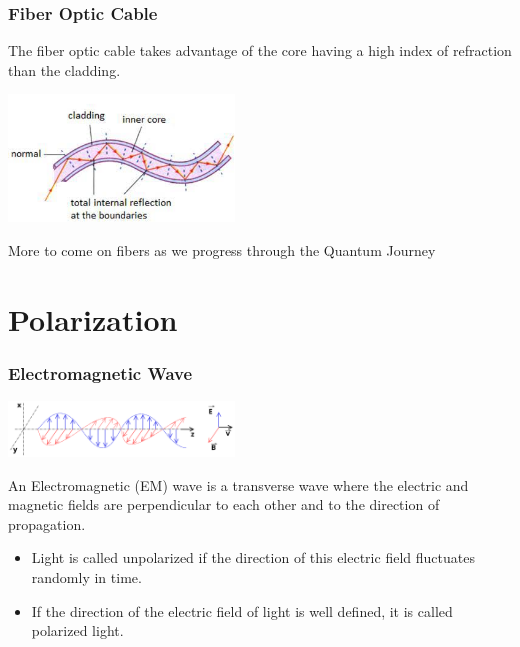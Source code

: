 \documentclass{beamer}
\begin{document}
\begin{frame}\frametitle{Fiber Optic Cable}
The fiber optic cable takes advantage of the core having a high index of refraction than the cladding.

\begin{center}
\includegraphics[width=6cm]{fig/cladding.jpg}
\end{center}

\vspace{3cm}

More to come on fibers as we progress through the Quantum Journey


\end{frame}


\section{Polarization}

\begin{frame}\frametitle{Electromagnetic Wave}

\begin{center}
\includegraphics[width=6cm]{fig/em_wave.png}
\end{center}

An Electromagnetic (EM) wave is a transverse wave where the electric and magnetic fields are perpendicular to each other and to the direction of propagation. 

\begin{itemize}
\item Light is called unpolarized if the direction of this electric field fluctuates randomly in time. 
\item If the direction of the electric field of light is well defined, it is called polarized light. 
\end{itemize}

\end{frame}
\end{document}
